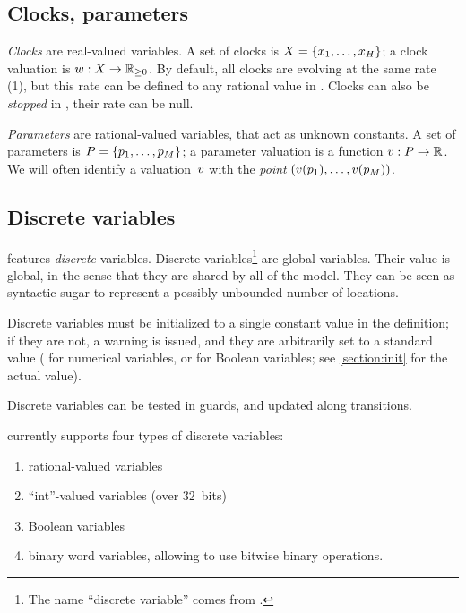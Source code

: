 \subsection{Clocks, parameters}

\emph{Clocks} are real-valued variables.
A set of clocks is $X = \{ x_1, \dots, x_H \}$;
a clock valuation is
$w : X \rightarrow \mathbb R_{\geq 0}$.
By default, all clocks are evolving at the same rate (1), but this rate can be defined to any rational value in \imitator{}.
Clocks can also be \emph{stopped} in \imitator{}, \ie{} their rate can be null.

\emph{Parameters} are rational-valued variables, that act as unknown constants.
A set of parameters is $P = \{ p_1, \dots, p_M \} $;
a parameter valuation is a function $v : P \rightarrow \mathbb R$.
We will often identify a valuation~$v$ with the \emph{point} $(v(p_1), \dots, v(p_{M}))$.


\subsection{Discrete variables}\label{section:discrete}

\imitator{} features \emph{discrete} variables.
%
Discrete variables\footnote{%
	The name ``discrete variable'' comes from \hytech{}.
}
are global variables.
Their value is global, in the sense that they are shared by all \IPTA{} of the model.
They can be seen as syntactic sugar to represent a possibly unbounded number of locations.


Discrete variables must be initialized to a single constant value in the  definition;
if they are not, a warning is issued, and they are arbitrarily set to a standard value (\eg{}  for numerical variables, or \BFalse{} for Boolean variables; see \cref{section:init} for the actual value).

Discrete variables can be tested in guards, and updated along transitions.

\imitator{} currently supports four types of discrete variables:
\begin{enumerate}
	\item rational-valued variables
	\item ``int''-valued variables (over 32~bits)
	\item Boolean variables
	\item binary word variables, allowing to use bitwise binary operations.
\end{enumerate}

